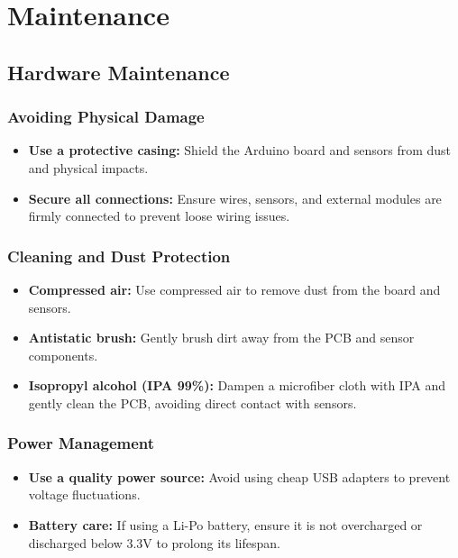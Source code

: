 %
%

\chapter{Maintenance}

\section{Hardware Maintenance}
\subsection{Avoiding Physical Damage}
\begin{itemize}
	\item \textbf{Use a protective casing:} Shield the Arduino board and sensors from dust and physical impacts.
	\item \textbf{Secure all connections:} Ensure wires, sensors, and external modules are firmly connected to prevent loose wiring issues.
\end{itemize}

\subsection{Cleaning and Dust Protection}
\begin{itemize}
	\item \textbf{Compressed air:} Use compressed air to remove dust from the board and sensors.
	\item \textbf{Antistatic brush:} Gently brush dirt away from the PCB and sensor components.
	\item \textbf{Isopropyl alcohol (IPA 99\%):} Dampen a microfiber cloth with IPA and gently clean the PCB, avoiding direct contact with sensors.
\end{itemize}

\subsection{Power Management}
\begin{itemize}
	\item \textbf{Use a quality power source:} Avoid using cheap USB adapters to prevent voltage fluctuations.
	\item \textbf{Battery care:} If using a Li-Po battery, ensure it is not overcharged or discharged below 3.3V to prolong its lifespan.
\end{itemize}

